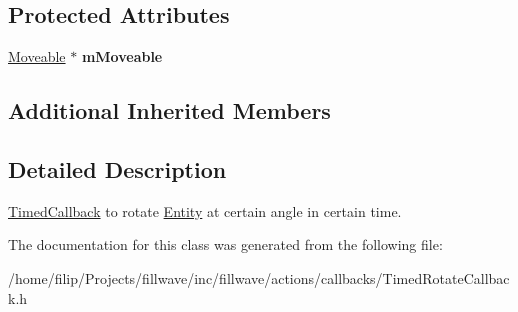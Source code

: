 \subsection*{Protected Attributes}
\begin{DoxyCompactItemize}
\item 
\hyperlink{classflw_1_1flf_1_1Moveable}{Moveable} $\ast$ {\bfseries m\+Moveable}\hypertarget{classflw_1_1flf_1_1TimedRotateCallback_a69603e28727289ee357b3f863cdc2a24}{}\label{classflw_1_1flf_1_1TimedRotateCallback_a69603e28727289ee357b3f863cdc2a24}

\end{DoxyCompactItemize}
\subsection*{Additional Inherited Members}


\subsection{Detailed Description}
\hyperlink{classflw_1_1flf_1_1TimedCallback}{Timed\+Callback} to rotate \hyperlink{classflw_1_1flf_1_1Entity}{Entity} at certain angle in certain time. 

The documentation for this class was generated from the following file\+:\begin{DoxyCompactItemize}
\item 
/home/filip/\+Projects/fillwave/inc/fillwave/actions/callbacks/Timed\+Rotate\+Callback.\+h\end{DoxyCompactItemize}
